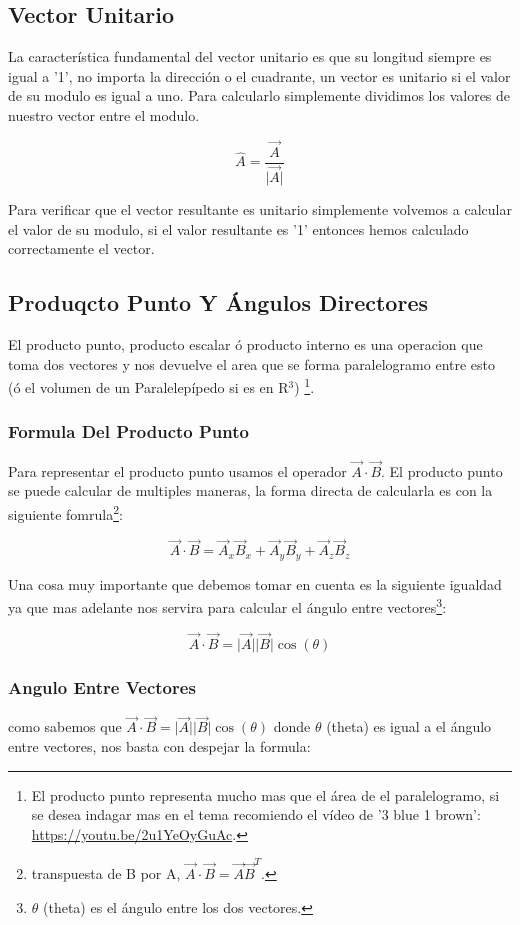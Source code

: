 \documentclass{article}
\begin{document}
\subsection{Vector Unitario}
\label{sec:orga966c48}
La característica fundamental del vector unitario es que su longitud siempre es igual a '1', no importa la dirección o el cuadrante, un vector es unitario si el valor de su modulo es igual a uno. Para calcularlo simplemente dividimos los valores de nuestro vector entre el modulo.

\[ 
\hat{A} = \frac{\vec{A}}{\vert\vec{A}\vert} 
\]

Para verificar que el vector resultante es unitario simplemente volvemos a calcular el valor de su modulo, si el valor resultante es '1' entonces hemos calculado correctamente el vector.

\subsection{Produqcto Punto Y Ángulos Directores}
\label{sec:org4ccd3f9}
El producto punto, producto escalar ó producto interno es una operacion que toma dos vectores y nos devuelve el area que se forma paralelogramo entre esto (ó el volumen de un Paralelepípedo si es en R\(^{\text{3}}\)) \footnote{El producto punto representa mucho mas que el área de el paralelogramo, si se desea indagar mas en el tema recomiendo el vídeo de '3 blue 1 brown': \url{https://youtu.be/2u1YeOyGuAc}.}.

\subsubsection*{Formula Del Producto Punto}
\label{sec:org5b73d76}
Para representar el producto punto usamos el operador \(\vec{A} \cdot \vec{B}\). 
El producto punto se puede calcular de multiples maneras, la forma directa de calcularla es con la siguiente fomrula\footnote{transpuesta de B por A, \(\vec{A} \cdot \vec{B} = \vec{A}\vec{B}^T\).}:

\[
\vec{A} \cdot \vec{B} = \vec{A}_x \vec{B}_x + \vec{A}_y \vec{B}_y + \vec{A}_z \vec{B}_z
\]

Una cosa muy importante que debemos tomar en cuenta es la siguiente igualdad ya que mas adelante nos servira para calcular el ángulo entre vectores\footnote{\(\theta\) (theta) es el ángulo entre los dos vectores.}:

\[
\vec{A}\cdot\vec{B} = \vert\vec{A}\vert\vert\vec{B}\vert \cos(\theta)
\]

\subsubsection*{Angulo Entre Vectores}
\label{sec:orgea851f3}
como sabemos que \(\vec{A}\cdot\vec{B} = \vert\vec{A}\vert\vert\vec{B}\vert \cos(\theta)\) donde \(\theta\) (theta) es igual a el ángulo entre vectores, nos basta con despejar la formula:
\end{document}
